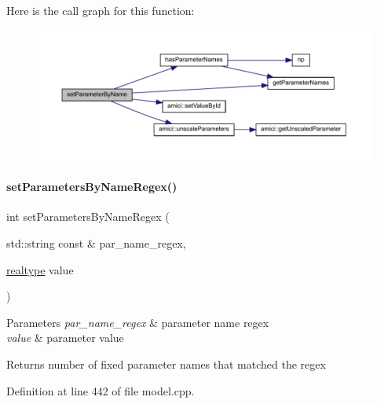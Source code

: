 Here is the call graph for this function\+:
\nopagebreak
\begin{figure}[H]
\begin{center}
\leavevmode
\includegraphics[width=350pt]{classamici_1_1_model_a6c5ceb2ba684cf68a7f21ad865091200_cgraph}
\end{center}
\end{figure}
\mbox{\label{classamici_1_1_model_a1307ed45ccda80e84174d6b495c85d8d}} 
\paragraph{\texorpdfstring{set\+Parameters\+By\+Name\+Regex()}{setParametersByNameRegex()}}
{\footnotesize\ttfamily int set\+Parameters\+By\+Name\+Regex (\begin{DoxyParamCaption}\item[{std\+::string const \&}]{par\+\_\+name\+\_\+regex,  }\item[{\mbox{\hyperlink{namespaceamici_a1bdce28051d6a53868f7ccbf5f2c14a3}{realtype}}}]{value }\end{DoxyParamCaption})}


\begin{DoxyParams}{Parameters}
{\em par\+\_\+name\+\_\+regex} & parameter name regex \\
\hline
{\em value} & parameter value \\
\hline
\end{DoxyParams}
\begin{DoxyReturn}{Returns}
number of fixed parameter names that matched the regex 
\end{DoxyReturn}


Definition at line 442 of file model.\+cpp.

